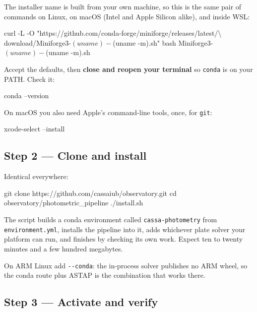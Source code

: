 \documentclass[11pt,a4paper]{article}
\newcommand{\cm}[1]{\texttt{\small #1}}
\begin{document}
The installer name is built from your own machine, so this is the same pair of
commands on Linux, on macOS (Intel and Apple Silicon alike), and inside WSL:

\begin{cmd}
\begin{cmdtext}
curl -L -O "https://github.com/conda-forge/miniforge/releases/latest/\textbackslash{}
download/Miniforge3-$(uname)-$(uname -m).sh"
bash Miniforge3-$(uname)-$(uname -m).sh
\end{cmdtext}
\end{cmd}

Accept the defaults, then \textbf{close and reopen your terminal} so \cm{conda}
is on your PATH. Check it:

\begin{cmd}
\begin{cmdtext}
conda --version
\end{cmdtext}
\end{cmd}

On macOS you also need Apple's command-line tools, once, for \cm{git}:

\begin{cmd}
\begin{cmdtext}
xcode-select --install
\end{cmdtext}
\end{cmd}

\subsection{Step 2 --- Clone and install}
Identical everywhere:

\begin{cmd}
\begin{cmdtext}
git clone https://github.com/cassaiub/observatory.git
cd observatory/photometric_pipeline
./install.sh
\end{cmdtext}
\end{cmd}

The script builds a conda environment called \cm{cassa-photometry} from
\cm{environment.yml}, installs the pipeline into it, adds whichever plate solver
your platform can run, and finishes by checking its own work. Expect ten to
twenty minutes and a few hundred megabytes.

On ARM Linux add \cm{-{}-conda}: the in-process solver publishes no ARM wheel,
so the conda route plus ASTAP is the combination that works there.

\subsection{Step 3 --- Activate and verify}
\end{document}

